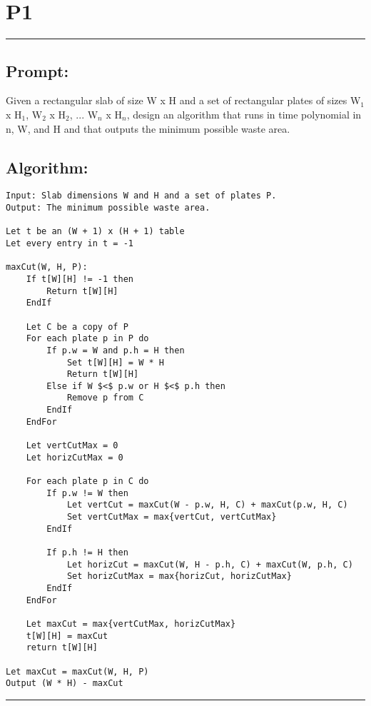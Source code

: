 \documentclass[11pt]{article}
\title{}
\author{}
\date{}
\begin{document}
\section*{P1}

\noindent\textcolor[RGB]{220,220,220}{\rule{\linewidth}{0.8pt}}

\subsection*{Prompt:} 

Given a rectangular slab of size W x H and a set of rectangular plates of sizes W$_1$ x H$_1$, W$_2$ x H$_2$, ... W$_n$ x H$_n$, design an algorithm that runs in time polynomial in n, W, and H and that outputs the minimum possible waste area. 

\subsection*{Algorithm:}

\begin{lstlisting}[basicstyle=\small, mathescape=true]
Input: Slab dimensions W and H and a set of plates P. 
Output: The minimum possible waste area. 

Let t be an (W + 1) x (H + 1) table
Let every entry in t = -1

maxCut(W, H, P):
	If t[W][H] != -1 then
		Return t[W][H]
	EndIf
	
	Let C be a copy of P
	For each plate p in P do
		If p.w = W and p.h = H then
			Set t[W][H] = W * H
			Return t[W][H]
		Else if W $<$ p.w or H $<$ p.h then
			Remove p from C
		EndIf
	EndFor
	
	Let vertCutMax = 0
	Let horizCutMax = 0
	
	For each plate p in C do
		If p.w != W then
			Let vertCut = maxCut(W - p.w, H, C) + maxCut(p.w, H, C)
			Set vertCutMax = max{vertCut, vertCutMax}
		EndIf
	
		If p.h != H then
			Let horizCut = maxCut(W, H - p.h, C) + maxCut(W, p.h, C)
			Set horizCutMax = max{horizCut, horizCutMax}
		EndIf
	EndFor
	
	Let maxCut = max{vertCutMax, horizCutMax}
	t[W][H] = maxCut
	return t[W][H]
	
Let maxCut = maxCut(W, H, P)
Output (W * H) - maxCut
\end{lstlisting}

\noindent\textcolor[RGB]{220,220,220}{\rule{\linewidth}{0.8pt}}
\linebreak
\end{document}
